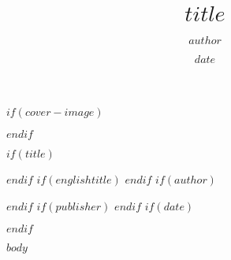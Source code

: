 \documentclass[$if(fontsize)$$fontsize$,$endif$$if(lang)$$babel-lang$,$endif$$if(papersize)$$papersize$paper,$endif$$for(classoption)$$classoption$$sep$,$endfor$]{$documentclass$}
\theoremstyle{plain}
\theoremstyle{definition}
\theoremstyle{remark}
\theoremstyle{ocrenumbox}
\theoremstyle{plain}
\begin{document}
$if(cover-image)$
  \cleardoublepage
  \thispagestyle{empty}
  \begin{center}
  \end{center}
  \cleardoublepage
$endif$


\let\oldincludegraphics\includegraphics
\renewcommand\includegraphics[2][]{%
\begin{adjustbox}{max size={\textwidth}{\textheight}}
\centering
\oldincludegraphics[#1]{#2}
\end{adjustbox}
}

$if(title)$
\title{$title$}
$endif$
$if(englishtitle)$
$endif$
$if(author)$
\author{$author$}
$endif$
$if(publisher)$
$endif$
$if(date)$
\date{$date$}
$endif$
\maketitle
\makeDeclareAuthorization

$body$

\backmatter	%

\printindex

\printbibliography[heading=bibintoc]
\end{document}
